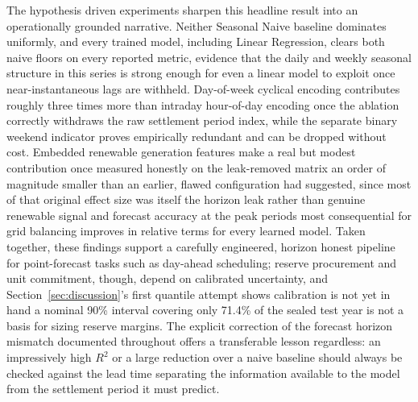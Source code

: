 \documentclass[runningheads]{llncs}
\begin{document}
The hypothesis driven experiments sharpen this headline result into an operationally grounded narrative. Neither Seasonal Naive baseline dominates uniformly, and every trained model, including Linear Regression, clears both naive floors on every reported metric, evidence that the daily and weekly seasonal structure in this series is strong enough for even a linear model to exploit once near-instantaneous lags are withheld. Day-of-week cyclical encoding contributes roughly three times more than intraday hour-of-day encoding once the ablation correctly withdraws the raw settlement period index, while the separate binary weekend indicator proves empirically redundant and can be dropped without cost. Embedded renewable generation features make a real but modest contribution once measured honestly on the leak-removed matrix an order of magnitude smaller than an earlier, flawed configuration had suggested, since most of that original effect size was itself the horizon leak rather than genuine renewable signal and forecast accuracy at the peak periods most consequential for grid balancing improves in relative terms for every learned model. Taken together, these findings support a carefully engineered, horizon honest pipeline for point-forecast tasks such as day-ahead scheduling; reserve procurement and unit commitment, though, depend on calibrated uncertainty, and Section~\ref{sec:discussion}'s first quantile attempt shows calibration is not yet in hand a nominal 90\% interval covering only 71.4\% of the sealed test year is not a basis for sizing reserve margins. The explicit correction of the forecast horizon mismatch documented throughout offers a transferable lesson regardless: an impressively high $R^2$ or a large reduction over a naive baseline should always be checked against the lead time separating the information available to the model from the settlement period it must predict.
\end{document}

